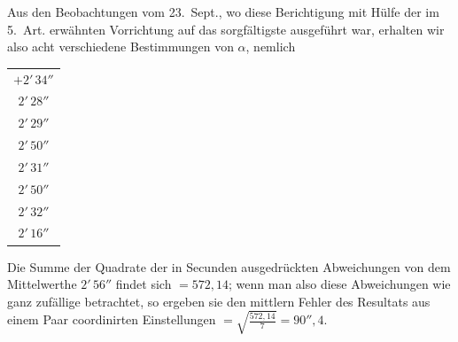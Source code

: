 \documentclass[12pt,a4paper]{article}
\begin{document}
Aus den Beobachtungen vom 23.~Sept., wo diese Berichtigung mit Hülfe der im 5.~Art. erwähnten Vorrichtung auf das sorgfältigste ausgeführt war, erhalten wir also acht verschiedene Bestimmungen von $\alpha$, nemlich
\begin{center}
\begin{tabular}{c}
$+2'\,34''$ \\
$2'\,28''$ \\
$2'\,29''$ \\
$2'\,50''$ \\
$2'\,31''$ \\
$2'\,50''$ \\
$2'\,32''$ \\
$2'\,16''$
\end{tabular}
\end{center}

Die Summe der Quadrate der in Secunden ausgedrückten Abweichungen von dem Mittelwerthe $2'\,56''$ findet sich $= 572{,}14$; wenn man also diese Abweichungen wie ganz zufällige betrachtet, so ergeben sie den mittlern Fehler des Resultats aus einem Paar coordinirten Einstellungen $= \sqrt{\frac{572{,}14}{7}} = 90''{,}4$.
\end{document}
